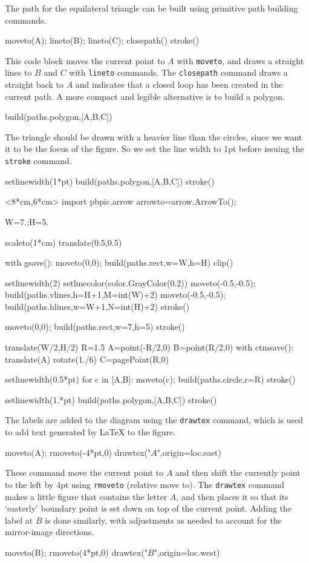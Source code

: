 \documentclass[12pt]{article}
\def\cmd#1{{\tt #1}}
\def\code#1{{\tt #1}}
\begin{document}
The path for the equilateral triangle can be built
using primitive path building commands.
\begin{snippet}
moveto(A); lineto(B); lineto(C); closepath()
stroke()
\end{snippet}
This code block moves the current point to $A$ with  \code{moveto}, 
and draws a straight lines to $B$ and $C$ with \code{lineto} commands.
The \code{closepath} command draws a straight back to $A$ and indicates 
that a closed loop has been created in the current path.  A more compact
and legible alternative is to build a polygon.
\begin{snippet}
build(paths.polygon,[A,B,C])
\end{snippet}

The triangle should be drawn with a heavier line than the circles,
since we want it to be the focus of the figure.  So we set the line width
to 1pt before issuing the \cmd{stroke} command.
\begin{snippet}
setlinewidth(1*pt)
build(paths.polygon,[A,B,C])
stroke()
\end{snippet}

\hfil\begin{pbpic}<8*cm,6*cm>
import pbpic.arrow
arrowto=arrow.ArrowTo();

W=7.;H=5.

scaleto(1*cm)
translate(0.5,0.5)

with gsave():
  moveto(0,0); build(paths.rect,w=W,h=H)
  clip()
  
  setlinewidth(2)
  setlinecolor(color.GrayColor(0.2))
  moveto(-0.5,-0.5); build(paths.vlines,h=H+1,M=int(W)+2)
  moveto(-0.5,-0.5); build(paths.hlines,w=W+1,N=int(H)+2)
  stroke()

moveto(0,0); build(paths.rect,w=7,h=5)
stroke()

translate(W/2,H/2)
R=1.5
A=point(-R/2,0)
B=point(R/2,0)
with ctmsave():
  translate(A)
  rotate(1./6)
  C=pagePoint(R,0)

setlinewidth(0.5*pt)
for c in [A,B]:
  moveto(c);
  build(paths.circle,r=R)
  stroke()
  
setlinewidth(1.*pt)
build(paths.polygon,[A,B,C])
stroke()
\end{pbpic}

The labels are added to the diagram using the \code{drawtex} command,
which is used to add text generated by LaTeX to the figure.
\begin{snippet}
moveto(A); rmoveto(-4*pt,0)
drawtex("$A$",origin=loc.east)
\end{snippet}
These command move the current point to $A$ and then shift
the currently point to the left by 4pt using \code{rmoveto} (relative
move to).  The \code{drawtex} command makes a little figure that contains
the letter $A$, and then places it so that its `easterly' boundary point is set down on top of the current point.  Adding the label at $B$ is
done similarly, with adjustments as needed to account for the mirror-image
directions.
\begin{snippet}
moveto(B); rmoveto(4*pt,0)
drawtex("$B$",origin=loc.west)
\end{snippet}
\end{document}

